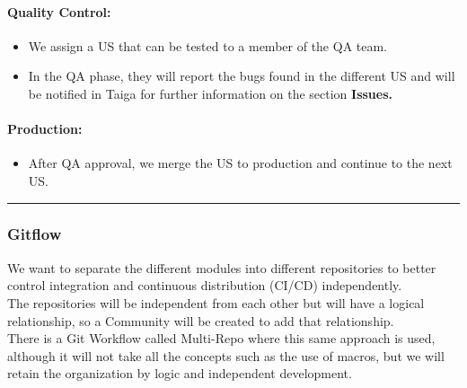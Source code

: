 \hypertarget{qualitycontrolnbsp}{
\paragraph{Quality Control:~}\label{qualitycontrolnbsp}}

\begin{itemize}
\tightlist
\item
  We assign a US that can be tested to a member of the QA team.
\item
  In the QA phase, they will report the bugs found in the different US
  and will be notified in Taiga for further information on the section
  \textbf{Issues.}
\end{itemize}

\hypertarget{productionnbsp}{
\paragraph{Production:~}\label{productionnbsp}}

\begin{itemize}
\tightlist
\item
  After QA approval, we merge the US to production and continue to the
  next US.
\end{itemize}

\begin{center}\rule{0.5\linewidth}{0.5pt}\end{center}

\hypertarget{gitflow}{
\subsubsection{Gitflow}\label{gitflow}}

We want to separate the different modules into different repositories to
better control integration and continuous distribution (CI/CD)
independently.\\
The repositories will be independent from each other but will have a
logical relationship, so a Community will be created to add that
relationship.\\
There is a Git Workflow called Multi-Repo where this same approach is
used, although it will not take all the concepts such as the use of
macros, but we will retain the organization by logic and independent
development.~

